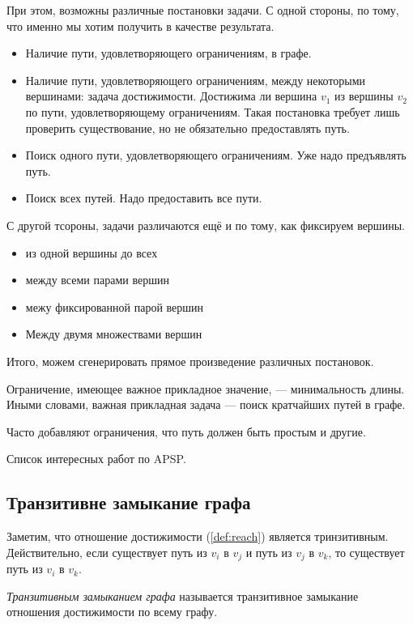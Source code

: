 При этом, возможны различные постановки задачи.
С одной стороны, по тому, что именно мы хотим получить в качестве результата.
\begin{itemize}
\item Наличие пути, удовлетворяющего ограничениям, в графе.
\item Наличие пути, удовлетворяющего ограничениям, между некоторыми вершинами: задача достижимости. 
      Достижима ли вершина $v_1$ из вершины $v_2$ по пути, удовлетворяющему ограничениям.
      Такая постановка требует лишь проверить существование, но не обязательно предоставлять путь.
\item Поиск одного пути, удовлетворяющего ограничениям. Уже надо предъявлять путь.
\item Поиск всех путей. Надо предоставить все пути.
\end{itemize}

С другой тсороны, задачи различаются ещё и по тому, как фиксируем вершины.
\begin{itemize}
\item из одной вершины до всех
\item между всеми парами вершин
\item межу фиксированной парой вершин
\item Между двумя множествами вершин
\end{itemize}

Итого, можем сгенерировать прямое произведение различных постановок.

Ограничение, имеющее важное прикладное значение, --- минимальность длины. 
Иными словами, важная прикладная задача --- поиск кратчайших путей в графе.

Часто добавляют ограничения, что путь должен быть простым и другие.

Список интересных работ по APSP.

\subsection{Транзитивне замыкание графа}

Заметим, что отношение достижимости (\ref{def:reach}) является тринзитивным.
Действительно, если существует путь из $v_i$ в $v_j$ и путь из $v_j$ в $v_k$, то существует путь из $v_i$ в $v_k$.

\begin{definition}
  \textit{Транзитивным замыканием графа} называется транзитивное замыкание отношения достижимости по всему графу.
\end{definition}

